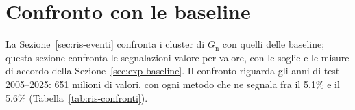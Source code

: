 
\section{Confronto con le baseline}
\label{sec:ris-confronti}

La Sezione~\ref{sec:ris-eventi} confronta i cluster di $G_{\mathrm{n}}$ con quelli delle baseline; questa sezione confronta le segnalazioni valore per valore, con le soglie e le misure di accordo della Sezione~\ref{sec:exp-baseline}. Il confronto riguarda gli anni di test 2005--2025: 651 milioni di valori, con ogni metodo che ne segnala fra il 5.1\% e il 5.6\% (Tabella~\ref{tab:ris-confronti}).

